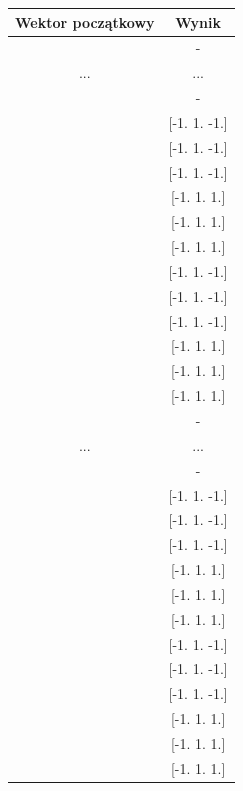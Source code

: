 \documentclass{article}
\begin{document}
\begin{table}[H]
\centering
\begin{tabular}{|c|c|}
\hline
Wektor początkowy & Wynik \\ \hline
[-1.0, -1.0, -1.0] & - \\ \hline
... & ... \\ \hline
[-1.0, 0.2, 1.0] & - \\ \hline
[-1.0, 0.6, -1.0] & [-1.  1. -1.] \\ \hline
[-1.0, 0.6, -0.6] & [-1.  1. -1.] \\ \hline
[-1.0, 0.6, -0.2] & [-1.  1. -1.] \\ \hline
[-1.0, 0.6, 0.2] & [-1.  1.  1.] \\ \hline
[-1.0, 0.6, 0.6] & [-1.  1.  1.] \\ \hline
[-1.0, 0.6, 1.0] & [-1.  1.  1.] \\ \hline
[-1.0, 1.0, -1.0] & [-1.  1. -1.] \\ \hline
[-1.0, 1.0, -0.6] & [-1.  1. -1.] \\ \hline
[-1.0, 1.0, -0.2] & [-1.  1. -1.] \\ \hline
[-1.0, 1.0, 0.2] & [-1.  1.  1.] \\ \hline
[-1.0, 1.0, 0.6] & [-1.  1.  1.] \\ \hline
[-1.0, 1.0, 1.0] & [-1.  1.  1.] \\ \hline
[-0.6, -1.0, -1.0] & - \\ \hline
... & ... \\ \hline
[-0.6, 0.2, 1.0] & - \\ \hline
[-0.6, 0.6, -1.0] & [-1.  1. -1.] \\ \hline
[-0.6, 0.6, -0.6] & [-1.  1. -1.] \\ \hline
[-0.6, 0.6, -0.2] & [-1.  1. -1.] \\ \hline
[-0.6, 0.6, 0.2] & [-1.  1.  1.] \\ \hline
[-0.6, 0.6, 0.6] & [-1.  1.  1.] \\ \hline
[-0.6, 0.6, 1.0] & [-1.  1.  1.] \\ \hline
[-0.6, 1.0, -1.0] & [-1.  1. -1.] \\ \hline
[-0.6, 1.0, -0.6] & [-1.  1. -1.] \\ \hline
[-0.6, 1.0, -0.2] & [-1.  1. -1.] \\ \hline
[-0.6, 1.0, 0.2] & [-1.  1.  1.] \\ \hline
[-0.6, 1.0, 0.6] & [-1.  1.  1.] \\ \hline
[-0.6, 1.0, 1.0] & [-1.  1.  1.] \\ \hline

\end{tabular}
\end{table}
\end{document}
